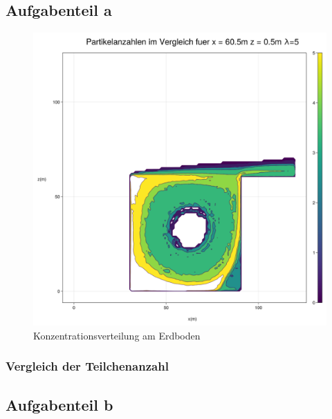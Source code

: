 \documentclass[ngerman]{scrartcl}
\begin{document}
\subsection{Aufgabenteil a}
\begin{figure}[H]
	\centering
	\includegraphics[scale=0.3]{Bilder/3_single_x = 60.5_5.png}
	\caption{Konzentrationsverteilung am Erdboden}
	\label{fig:my_label}
\end{figure}

\subsubsection{Vergleich der Teilchenanzahl}
\subsection{Aufgabenteil b}
\end{document}
